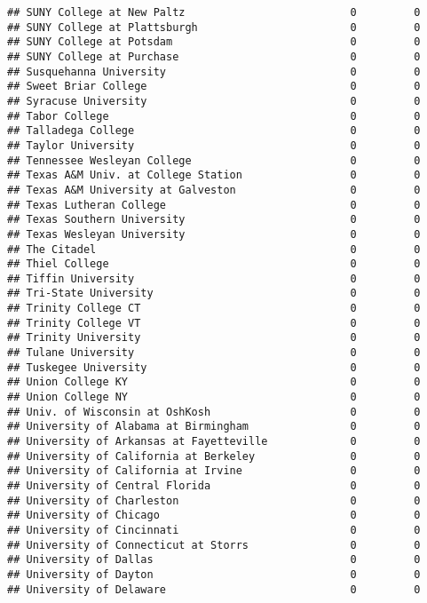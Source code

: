 \documentclass[
]{article}
\begin{document}
\begin{verbatim}
## SUNY College at New Paltz                          0         0
## SUNY College at Plattsburgh                        0         0
## SUNY College at Potsdam                            0         0
## SUNY College at Purchase                           0         0
## Susquehanna University                             0         0
## Sweet Briar College                                0         0
## Syracuse University                                0         0
## Tabor College                                      0         0
## Talladega College                                  0         0
## Taylor University                                  0         0
## Tennessee Wesleyan College                         0         0
## Texas A&M Univ. at College Station                 0         0
## Texas A&M University at Galveston                  0         0
## Texas Lutheran College                             0         0
## Texas Southern University                          0         0
## Texas Wesleyan University                          0         0
## The Citadel                                        0         0
## Thiel College                                      0         0
## Tiffin University                                  0         0
## Tri-State University                               0         0
## Trinity College CT                                 0         0
## Trinity College VT                                 0         0
## Trinity University                                 0         0
## Tulane University                                  0         0
## Tuskegee University                                0         0
## Union College KY                                   0         0
## Union College NY                                   0         0
## Univ. of Wisconsin at OshKosh                      0         0
## University of Alabama at Birmingham                0         0
## University of Arkansas at Fayetteville             0         0
## University of California at Berkeley               0         0
## University of California at Irvine                 0         0
## University of Central Florida                      0         0
## University of Charleston                           0         0
## University of Chicago                              0         0
## University of Cincinnati                           0         0
## University of Connecticut at Storrs                0         0
## University of Dallas                               0         0
## University of Dayton                               0         0
## University of Delaware                             0         0

\end{verbatim}
\end{document}
